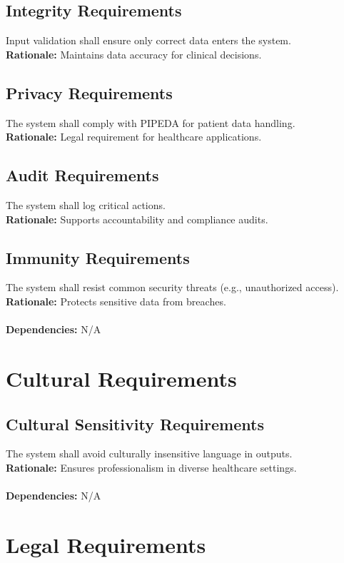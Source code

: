 \documentclass[12pt]{article}
\begin{document}
\begin{itemize}
\subsection{Integrity Requirements}
Input validation shall ensure only correct data enters the system.  \\
\textbf{Rationale:} Maintains data accuracy for clinical decisions.

\subsection{Privacy Requirements}
The system shall comply with PIPEDA for patient data handling.  \\
\textbf{Rationale:} Legal requirement for healthcare applications.

\subsection{Audit Requirements}
The system shall log critical actions. \\ 
\textbf{Rationale:} Supports accountability and compliance audits.

\subsection{Immunity Requirements}
The system shall resist common security threats (e.g., unauthorized access).  \\
\textbf{Rationale:} Protects sensitive data from breaches. \\
  \\
\textbf{Dependencies:} N/A

\section{Cultural Requirements} \label{NFR_Cultural}
\subsection{Cultural Sensitivity Requirements}
The system shall avoid culturally insensitive language in outputs.  \\
\textbf{Rationale:} Ensures professionalism in diverse healthcare settings. \\
  \\
\textbf{Dependencies:} N/A

\section{Legal Requirements} \label{NFR_Legal}

\end{itemize}
\end{document}
